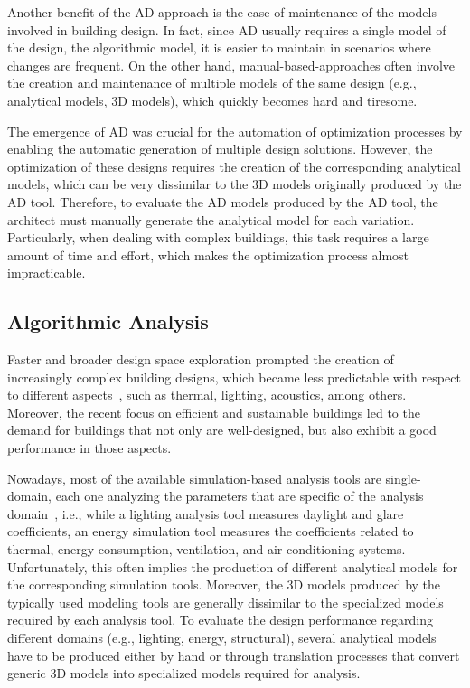 Another benefit of the \ac{AD} approach is the ease of maintenance of the models involved in building design. In fact, since \ac{AD} usually requires a single model of the design, the algorithmic model, it is easier to maintain in scenarios where changes are frequent. On the other hand, manual-based-approaches often involve the creation and maintenance of multiple models of the same design (e.g., analytical models, 3D models), which quickly becomes hard and tiresome.

The emergence of \ac{AD} was crucial for the automation of optimization processes by enabling the automatic generation of multiple design solutions. However, the optimization of these designs requires the creation of the corresponding analytical models, which can be very dissimilar to the 3D models originally produced by the \ac{AD} tool. Therefore, to evaluate the \ac{AD} models produced by the \ac{AD} tool, the architect must manually generate the analytical model for each variation. Particularly, when dealing with complex buildings, this task requires a large amount of time and effort, which makes the optimization process almost impracticable.

\subsection{Algorithmic Analysis}
\label{ssec:aa}

Faster and broader design space exploration prompted the creation of increasingly complex building designs, which became less predictable with respect to different aspects~\cite{Branco2017AD}, such as thermal, lighting, acoustics, among others. Moreover, the recent focus on efficient and sustainable buildings led to the demand for buildings that not only are well-designed, but also exhibit a good performance in those aspects.
	
Nowadays, most of the available simulation-based analysis tools are single-domain, each one analyzing the parameters that are specific of the analysis domain~\cite{Malkawi2005}, i.e., while a lighting analysis tool measures daylight and glare coefficients, an energy simulation tool measures the coefficients related to thermal, energy consumption, ventilation, and air conditioning systems. Unfortunately, this often implies the production of different analytical models for the corresponding simulation tools. Moreover, the 3D models produced by the typically used modeling tools are generally dissimilar to the specialized models required by each analysis tool. To evaluate the design performance regarding different domains (e.g., lighting, energy, structural), several analytical models have to be produced either by hand or through translation processes that convert generic 3D models into specialized models required for analysis.

